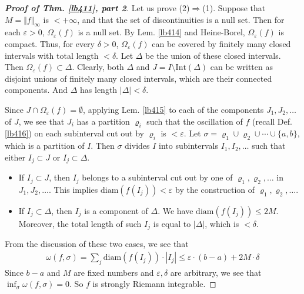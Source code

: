 \documentclass[12pt,b5paper,notitlepage]{article}
\theoremstyle{definition}
\theoremstyle{plain}
\newcommand{\Int}{\mathrm{Int}}
\newcommand{\diam}{\mathrm{diam}}
\newcommand{\eps}{\varepsilon}
\numberwithin{equation}{section}
\begin{document}
\begin{proof}[\textbf{Proof of Thm. \ref{lb411}, part 2}]
Let us prove (2)$\Rightarrow$(1). Suppose that $M=\Vert f\Vert_\infty$ is $<+\infty$, and that the set of discontinuities is a null set. Then for each $\eps>0$, $\Omega_\eps(f)$ is a null set. By Lem. \ref{lb414} and Heine-Borel, $\Omega_\eps(f)$ is compact. Thus, for every $\delta>0$, $\Omega_\eps(f)$ can be covered by finitely many closed intervals with total length $<\delta$. Let $\Delta$ be the union of these closed intervals. Then $\Omega_\eps(f)\subset\Delta$. Clearly, both $\Delta$ and $J=I\setminus\Int(\Delta)$ can be written as disjoint unions of finitely many closed intervals, which are their connected components. And $\Delta$ has length $|\Delta|<\delta$.

Since $J\cap\Omega_\eps(f)=\emptyset$, applying Lem. \ref{lb415} to each of the components $J_1,J_2,\dots$ of $J$, we see that $J_i$ has a partition $\varrho_i$ such that the oscillation of $f$ (recall Def. \ref{lb416}) on each subinterval cut out by $\varrho_i$  is $<\eps$. Let $\sigma=\varrho_1\cup\varrho_2\cup\cdots\cup\{a,b\}$, which is a partition of $I$. Then $\sigma$ divides $I$ into subintervals $I_1,I_2,\dots$ such that either $I_j\subset J$ or $I_j\subset\Delta$.
\begin{itemize}
\item If $I_j\subset J$, then $I_j$ belongs to a subinterval cut out by one of $\varrho_1,\varrho_2,\dots$ in $J_1,J_2,\dots$. This implies $\diam(f(I_j))<\eps$ by the construction of $\varrho_1,\varrho_2,\dots$.
\item If $I_j\subset\Delta$, then $I_j$ is a component of $\Delta$. We have $\diam(f(I_j))\leq 2M$. Moreover, the total length of such $I_j$ is equal to $|\Delta|$, which is $<\delta$.
\end{itemize}
From the discussion of these two cases, we see that 
\begin{align*}
\omega(f,\sigma)=\sum_j\diam(f(I_j))\cdot|I_j|\leq \eps\cdot (b-a)+2M\cdot\delta
\end{align*}
Since $b-a$ and $M$ are fixed numbers and $\eps,\delta$ are arbitrary, we see that $\inf_{\sigma}\omega(f,\sigma)=0$. So $f$ is strongly Riemann integrable.
\end{proof}
\end{document}

